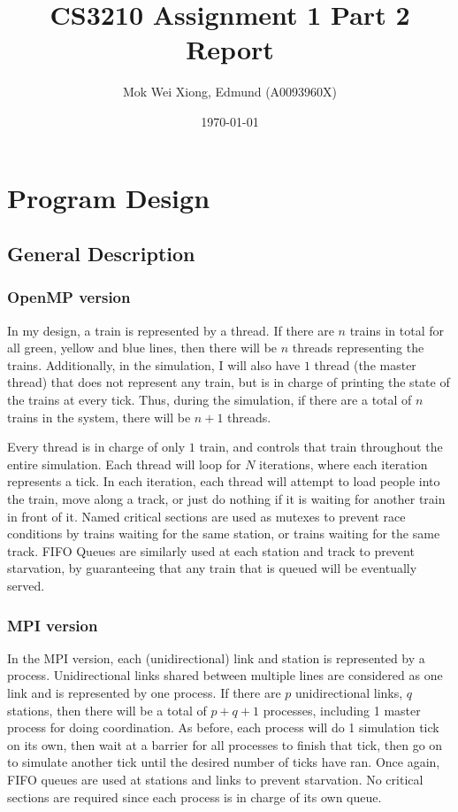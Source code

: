 \documentclass[12pt]{article}
\title{CS3210 Assignment 1 Part 2 Report}
\date{\today}
\author{Mok Wei Xiong, Edmund (A0093960X)}
\begin{document}
\maketitle

\section{Program Design}

\subsection{General Description}
\subsubsection{OpenMP version}
In my design, a train is represented by a thread. If there are $n$ trains in total for all green, yellow and blue lines, then there will be $n$ threads representing the trains. Additionally, in the simulation, I will also have $1$ thread (the master thread) that does not represent any train, but is in charge of printing the state of the trains at every tick. Thus, during the simulation, if there are a total of $n$ trains in the system, there will be $n+1$ threads.

\bigbreak \noindent Every thread is in charge of only $1$ train, and controls that train throughout the entire simulation. Each thread will loop for $N$ iterations, where each iteration represents a tick. In each iteration, each thread will attempt to load people into the train, move along a track, or just do nothing if it is waiting for another train in front of it. Named critical sections are used as mutexes to prevent race conditions by trains waiting for the same station, or trains waiting for the same track. FIFO Queues are similarly used at each station and track to prevent starvation, by guaranteeing that any train that is queued will be eventually served.

\subsubsection{MPI version}
In the MPI version, each (unidirectional) link and station is represented by a process. Unidirectional links shared between multiple lines are considered as one link and is represented by one process. If there are $p$ unidirectional links, $q$ stations, then there will be a total of $p+q+1$ processes, including 1 master process for doing coordination. As before, each process will do 1 simulation tick on its own, then wait at a barrier for all processes to finish that tick, then go on to simulate another tick until the desired number of ticks have ran. Once again, FIFO queues are used at stations and links to prevent starvation. No critical sections are required since each process is in charge of its own queue.
\end{document}
